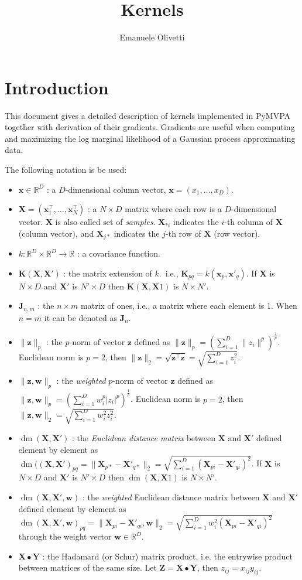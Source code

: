 \documentclass[a4paper,11pt]{article}
\title{Kernels}
\author{Emanuele Olivetti}
\newcommand\R{{\mathbb R}}
\newcommand\x{{\mathbf x}}
\newcommand\X{{\mathbf X}}
\newcommand\K{{\mathbf K}}
\newcommand\J{{\mathbf J}}
\DeclareMathOperator*{\dm}{dm}
\begin{document}
\maketitle

\section{Introduction}
This document gives a detailed description of kernels implemented in
PyMVPA together with derivation of their gradients. Gradients are
useful when computing and maximizing the log marginal likelihood of a
Gaussian process approximating data.

The following notation is be used:
\begin{itemize}
\item $\x \in \R^D$ : a $D$-dimensional column vector, $\x =
  (x_1,\ldots,x_D)$.
\item $\X = (\x_1^{\top},\ldots,\x_N^{\top})$ : a $N \times D$
  matrix where each row is a $D$-dimensional vector. $\X$ is also
  called set of \emph{samples}. $\X_{* i}$ indicates the $i$-th
  column of $\X$ (column vector), and $\X_{j *}$ indicates the
  $j$-th row of $\X$ (row vector).
\item $k: \R^D \times \R^D \rightarrow \R$ : a covariance function.
\item $\K(\X,\X')$ : the matrix extension of $k$.\, i.e., $\K_{pq} =
  k(\x_p,\x'_q)$. If $\X$ is $N \times D$ and $\X'$ is $N' \times D$
  then $\K(\X,\X1)$ is $N \times N'$.
\item $\J_{n,m}$ : the $n \times m$ matrix of ones, i.e., a matrix
  where each element is 1. When $n = m$ it can be denoted as $\J_n$.
\item $\|\mathbf{z}\|_p$ : the $p$-norm of vector $\mathbf{z}$ defined
  as $\|\mathbf{z}\|_p = (\sum_{i=1}^D \|z_i\|^p)^{\frac{1}{p}}$.
  Euclidean norm is $p=2$, then $\|\mathbf{z}\|_2 =
  \sqrt{\mathbf{z}^{\top}\mathbf{z}} = \sqrt{\sum_{i=1}^D z_i^2}$.
\item $\|\mathbf{z},\mathbf{w}\|_p$ : the \emph{weighted} $p$-norm of
  vector $\mathbf{z}$ defined as $\|\mathbf{z},\mathbf{w}\|_p =
  (\sum_{i=1}^D w_i^p|z_i|^p)^{\frac{1}{p}}$.  Euclidean norm is
  $p=2$, then $\|\mathbf{z},\mathbf{w}\|_2 = \sqrt{\sum_{i=1}^D w_i^2
    z_i^2}$.
\item $\dm(\X,\X')$ : the \emph{Euclidean distance matrix} between
  $\X$ and $\X'$ defined element by element as $\dm((\X,\X')_{pq} =
  \|\X_{p *} - \X'_{q *}\|_2 = \sqrt{\sum_{i=1}^D (\X_{p i} - \X'_{q
      i})^2}$. If $\X$ is $N \times D$ and $\X'$ is $N' \times D$ then
  $\dm(\X,\X1)$ is $N \times N'$.
\item $\dm(\X,\X',\mathbf{w})$ : the \emph{weighted} Euclidean
  distance matrix between $\X$ and $\X'$ defined element by element as
  $\dm(\X,\X',\mathbf{w})_{pq} = \|\X_{p i} - \X'_{q i}, \mathbf{w}\|_2
  = \sqrt{\sum_{i=1}^D w_i^2(\X_{p i} - \X'_{q i})^2}$ through the
  weight vector $\mathbf{w} \in \R^D$.
\item $\X \bullet \mathbf{Y}$ : the Hadamard (or Schur) matrix
  product, i.e. the entrywise product between matrices of the same
  size. Let $\mathbf{Z} = \X \bullet \mathbf{Y}$, then $z_{ij} =
  x_{ij} y_{ij}$.
\end{itemize}
\end{document}
